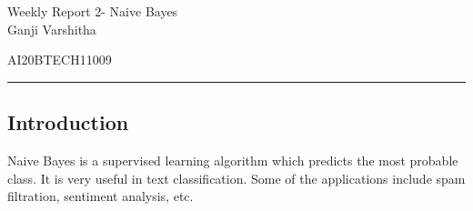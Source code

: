\documentclass[12pt,letterpaper, onecolumn]{exam}
\begin{document}
\newtheorem{theorem}{Theorem}[section]
\newtheorem{problem}{Problem}
\newtheorem{proposition}{Proposition}[section]
\newtheorem{lemma}{Lemma}[section]
\newtheorem{corollary}[theorem]{Corollary}
\newtheorem{example}{Example}[section]
\newtheorem{definition}[problem]{Definition}

\newcommand{\BEQA}{\begin{eqnarray}}
\newcommand{\EEQA}{\end{eqnarray}}
\newcommand{\define}{\stackrel{\triangle}{=}}

\raggedbottom
\setlength{\parindent}{0pt}
\providecommand{\mbf}{\mathbf}
\providecommand{\norm}[1]{\lVert#1\rVert}
\providecommand{\pr}[1]{\ensuremath{\Pr\left(#1\right)}}
\providecommand{\qfunc}[1]{\ensuremath{Q\left(#1\right)}}
\providecommand{\sbrak}[1]{\ensuremath{{}\left[#1\right]}}
\providecommand{\lsbrak}[1]{\ensuremath{{}\left[#1\right.}}
\providecommand{\rsbrak}[1]{\ensuremath{{}\left.#1\right]}}
\providecommand{\brak}[1]{\ensuremath{\left(#1\right)}}
\providecommand{\lbrak}[1]{\ensuremath{\left(#1\right.}}
\providecommand{\rbrak}[1]{\ensuremath{\left.#1\right)}}
\providecommand{\cbrak}[1]{\ensuremath{\left\{#1\right\}}}
\providecommand{\lcbrak}[1]{\ensuremath{\left\{#1\right.}}
\providecommand{\rcbrak}[1]{\ensuremath{\left.#1\right\}}}
\let\vec\mathbf




\begingroup  
    \centering
    
    \LARGE Weekly Report 2- Naive Bayes\\[0.5em]
    
    \large Ganji Varshitha\par
    \large AI20BTECH11009\par
\endgroup
\rule{\textwidth}{0.4pt}
\pointsdroppedatright   %
\printanswers
\newcommand\Solution{
  \textbf{Solution:}\\}
\newcommand{\myvec}[1]{\ensuremath{\begin{bmatrix}#1\end{bmatrix}}}

 \subsection*{Introduction}
Naive Bayes is a supervised learning algorithm which predicts the most probable class. It is very useful in text classification. Some of the applications include spam filtration, sentiment analysis, etc.
\end{document}

